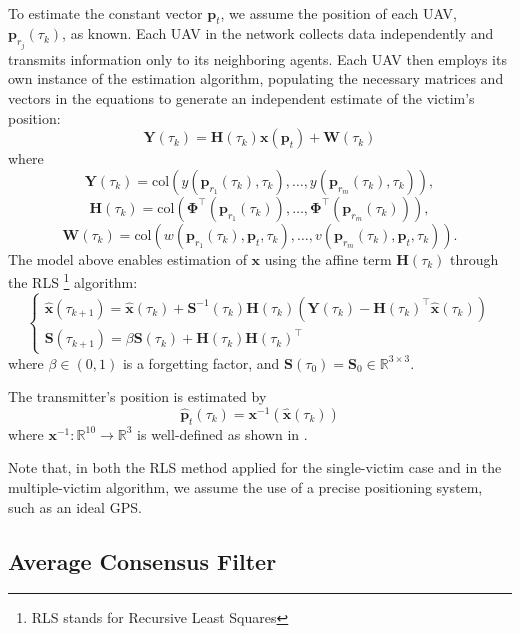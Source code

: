 \noindent
\\
To estimate the constant vector \( \mathbf{p}_t \), we assume the position of each 
UAV, \( \mathbf{p}_{r_j}(\tau_k) \), as known. 
Each UAV in the network collects data independently and transmits information only 
to its neighboring agents. Each UAV then employs its own instance of the estimation 
algorithm, populating the necessary matrices and vectors in the equations to 
generate an independent estimate of the victim’s position:
\[
\mathbf{Y}(\tau_k) = \mathbf{H}(\tau_k) \mathbf{x}(\mathbf{p}_t) + \mathbf{W}(\tau_k)
\]
where
\[
\mathbf{Y}(\tau_k) = \mathrm{col}(y(\mathbf{p}_{r_1}(\tau_k), \tau_k), \ldots, y(\mathbf{p}_{r_m}(\tau_k), \tau_k)),
\]
\[
\mathbf{H}(\tau_k) = \mathrm{col}(\mathbf{\Phi}^\top(\mathbf{p}_{r_1}(\tau_k)), \ldots, \mathbf{\Phi}^\top(\mathbf{p}_{r_m}(\tau_k))),
\]
\[
\mathbf{W}(\tau_k) = \mathrm{col}(w(\mathbf{p}_{r_1}(\tau_k),\mathbf{p}_t, \tau_k), \ldots, v(\mathbf{p}_{r_m}(\tau_k), \mathbf{p}_t, \tau_k)).
\]
The model above enables estimation of \( \mathbf{x} \) using the affine term 
\( \mathbf{H}(\tau_k) \) through the RLS \footnote{RLS stands for Recursive Least Squares} algorithm:
\[
\begin{cases}
    \hat{\mathbf{x}}(\tau_{k+1}) = \hat{\mathbf{x}}(\tau_k) + \mathbf{S}^{-1}(\tau_k)\mathbf{H}(\tau_k) \left( \mathbf{Y}(\tau_k) - \mathbf{H}(\tau_k)^\top \hat{\mathbf{x}}(\tau_k) \right) \\
    \mathbf{S}(\tau_{k+1}) = \beta \mathbf{S}(\tau_k) + \mathbf{H}(\tau_k)\mathbf{H}(\tau_k)^\top
\end{cases}
\]
where \( \beta \in (0, 1) \) is a forgetting factor, and \( \mathbf{S}(\tau_0) = \mathbf{S}_0 \in \mathbb{R}^{3 \times 3} \). 

\noindent
The transmitter's position is estimated by
\begin{equation}
    \hat{\mathbf{p}}_t(\tau_k) = \mathbf{x}^{-1}(\hat{\mathbf{x}}(\tau_k))
    \label{eq:mapping}
\end{equation}
where \( \mathbf{x}^{-1} : \mathbb{R}^{10} \rightarrow \mathbb{R}^3 \) is well-defined as shown in \cite{similar-main}. 

\noindent
Note that, in both the RLS method applied for the single-victim case and in the multiple-victim algorithm, 
we assume the use of a precise positioning system, such as an ideal GPS.

\subsection{Average Consensus Filter}

